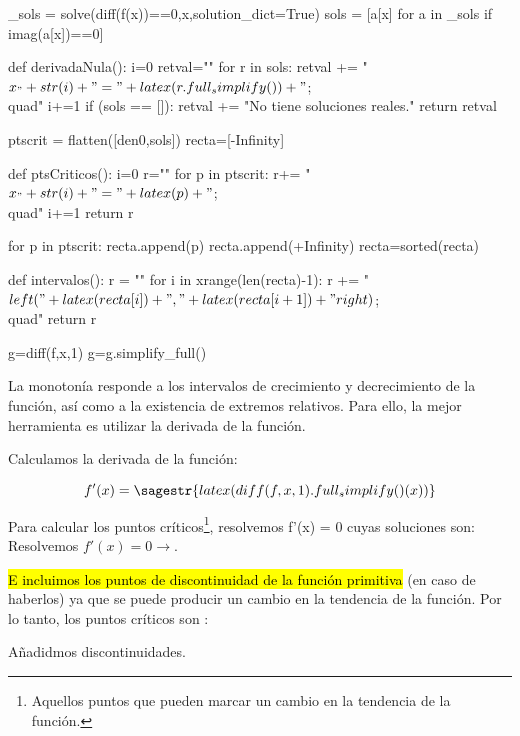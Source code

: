 \begin{sagesilent}

_sols = solve(diff(f(x))==0,x,solution_dict=True)
sols = [a[x] for a in _sols if imag(a[x])==0]

def derivadaNula():
    i=0
    retval=""
    for r in sols:
        retval += "$x_"+str(i)+" = "+latex(r.full_simplify())+"$;\\quad"
        i+=1
    if (sols == []):
        retval += "No tiene soluciones reales."
    return retval

ptscrit = flatten([den0,sols])
recta=[-Infinity]

def ptsCriticos():
    i=0
    r=""
    for p in ptscrit:
        r+= "$x_"+str(i)+"="+latex(p)+"$;\\quad"
        i+=1
    return r

for p in ptscrit:
     recta.append(p)
recta.append(+Infinity)
recta=sorted(recta)

def intervalos():
    r = ""
    for i in xrange(len(recta)-1):
        r += "$\\left("+latex(recta[i])+","+latex(recta[i+1])+"\\right)$;\\quad"  
    return r

g=diff(f,x,1)
g=g.simplify_full()
\end{sagesilent}

\ifverbose
La monotonía responde a los intervalos de crecimiento y decrecimiento de la función, así como a la existencia de extremos relativos.
%
Para ello, la mejor herramienta es utilizar la derivada de la función.

Calculamos la derivada de la función:
\fi

\[f'(x) = \sagestr{latex(diff(f,x,1).full_simplify()(x))} \]%

\ifverbose
    Para calcular los puntos críticos\footnote{Aquellos puntos que pueden marcar un cambio en la tendencia de la función.}, resolvemos f'(x) = 0 cuyas soluciones son:
    \\

\else
    Resolvemos $f'(x) = 0\rightarrow $. 
\fi
{}

\ifverbose
\hl{E incluimos los puntos de discontinuidad de la función primitiva} (en caso de haberlos) ya que se puede producir un cambio en la tendencia de la función. 
%
Por lo tanto, los puntos críticos son : 

\else
Añadidmos discontinuidades. 

